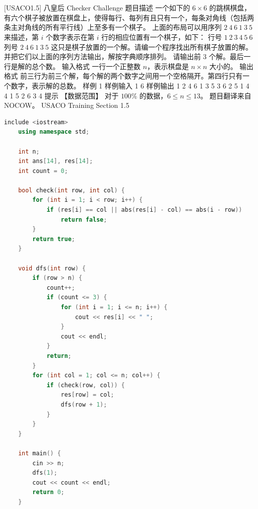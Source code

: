 \documentclass[12pt,twiside,a4paper]{ctexbook}
\numberwithin{chapter}{part}
\begin{document}
\section{}
 [USACO1.5] 八皇后 Checker Challenge
 题目描述
一个如下的 $6 \times 6$ 的跳棋棋盘，有六个棋子被放置在棋盘上，使得每行、每列有且只有一个，每条对角线（包括两条主对角线的所有平行线）上至多有一个棋子。
上面的布局可以用序列 $2\ 4\ 6\ 1\ 3\ 5$ 来描述，第 $i$ 个数字表示在第 $i$ 行的相应位置有一个棋子，如下：
行号 $1\ 2\ 3\ 4\ 5\ 6$
列号 $2\ 4\ 6\ 1\ 3\ 5$
这只是棋子放置的一个解。请编一个程序找出所有棋子放置的解。  
并把它们以上面的序列方法输出，解按字典顺序排列。  
请输出前 $3$ 个解。最后一行是解的总个数。
 输入格式
一行一个正整数 $n$，表示棋盘是 $n \times n$ 大小的。
 输出格式
前三行为前三个解，每个解的两个数字之间用一个空格隔开。第四行只有一个数字，表示解的总数。
 样例 1
 样例输入 1
6
 样例输出 1
2 4 6 1 3 5
3 6 2 5 1 4
4 1 5 2 6 3
4
 提示
【数据范围】  
对于 $100\%$ 的数据，$6 \le n \le 13$。
题目翻译来自NOCOW。
USACO Training Section 1.5
\begin{lstlisting}[language=c++,breaklines=true]
    include <iostream>
    using namespace std;
    
    int n;
    int ans[14], res[14];
    int count = 0;
    
    bool check(int row, int col) {
        for (int i = 1; i < row; i++) {
            if (res[i] == col || abs(res[i] - col) == abs(i - row))
                return false;
        }
        return true;
    }
    
    void dfs(int row) {
        if (row > n) {
            count++;
            if (count <= 3) {
                for (int i = 1; i <= n; i++) {
                    cout << res[i] << " ";
                }
                cout << endl;
            }
            return;
        }
        for (int col = 1; col <= n; col++) {
            if (check(row, col)) {
                res[row] = col;
                dfs(row + 1);
            }
        }
    }
    
    int main() {
        cin >> n;
        dfs(1);
        cout << count << endl;
        return 0;
    }
\end{lstlisting}
\end{document}
